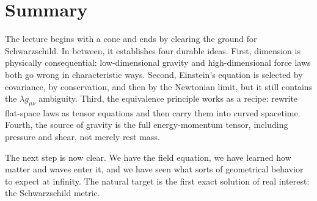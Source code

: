 \section{Summary}

The lecture begins with a cone and ends by clearing the ground for Schwarzschild. In between, it establishes four durable ideas. First, dimension is physically consequential: low-dimensional gravity and high-dimensional force laws both go wrong in characteristic ways. Second, Einstein's equation is selected by covariance, by conservation, and then by the Newtonian limit, but it still contains the \(\lambda g_{\mu\nu}\) ambiguity. Third, the equivalence principle works as a recipe: rewrite flat-space laws as tensor equations and then carry them into curved spacetime. Fourth, the source of gravity is the full energy-momentum tensor, including pressure and shear, not merely rest mass.

The next step is now clear. We have the field equation, we have learned how matter and waves enter it, and we have seen what sorts of geometrical behavior to expect at infinity. The natural target is the first exact solution of real interest: the Schwarzschild metric.